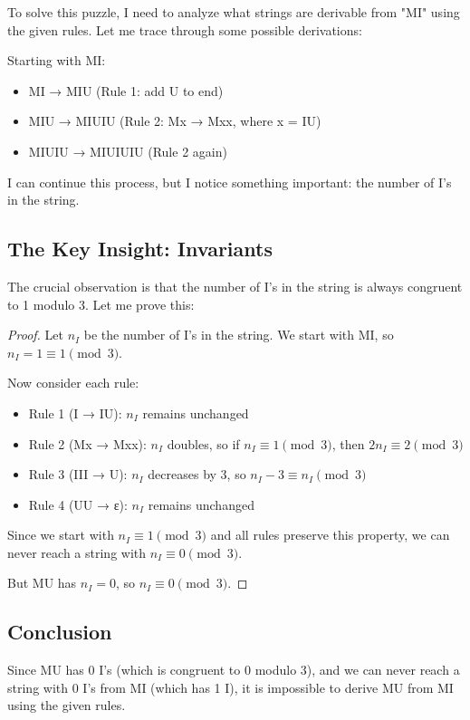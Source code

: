 \documentclass{article}
\theoremstyle{plain}
\theoremstyle{definition}
\theoremstyle{remark}
\begin{document}
To solve this puzzle, I need to analyze what strings are derivable from "MI" using the given rules. Let me trace through some possible derivations:

Starting with MI:
\begin{itemize}
\item MI → MIU (Rule 1: add U to end)
\item MIU → MIUIU (Rule 2: Mx → Mxx, where x = IU)
\item MIUIU → MIUIUIU (Rule 2 again)
\end{itemize}

I can continue this process, but I notice something important: the number of I's in the string.

\subsection{The Key Insight: Invariants}

The crucial observation is that the number of I's in the string is always congruent to 1 modulo 3. Let me prove this:

\begin{proof}
Let $n_I$ be the number of I's in the string. We start with MI, so $n_I = 1 \equiv 1 \pmod{3}$.

Now consider each rule:
\begin{itemize}
\item Rule 1 (I → IU): $n_I$ remains unchanged
\item Rule 2 (Mx → Mxx): $n_I$ doubles, so if $n_I \equiv 1 \pmod{3}$, then $2n_I \equiv 2 \pmod{3}$
\item Rule 3 (III → U): $n_I$ decreases by 3, so $n_I - 3 \equiv n_I \pmod{3}$
\item Rule 4 (UU → ε): $n_I$ remains unchanged
\end{itemize}

Since we start with $n_I \equiv 1 \pmod{3}$ and all rules preserve this property, we can never reach a string with $n_I \equiv 0 \pmod{3}$.

But MU has $n_I = 0$, so $n_I \equiv 0 \pmod{3}$.
\end{proof}

\subsection{Conclusion}

Since MU has 0 I's (which is congruent to 0 modulo 3), and we can never reach a string with 0 I's from MI (which has 1 I), it is impossible to derive MU from MI using the given rules.
\end{document}
